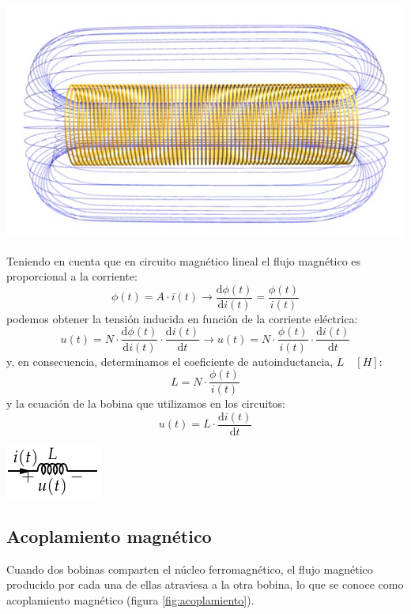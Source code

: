 \begin{center}
\includegraphics[height=0.2\textheight]{../figs/Solenoide.jpg}
\end{center}

Teniendo en cuenta que en circuito magnético lineal el flujo magnético es proporcional a la corriente:
\[
  \phi(t) = A \cdot i(t) \rightarrow   \frac{\mathrm{d}\phi(t)}{\mathrm{d} i(t)} = \frac{\phi(t)}{i(t)}
\]
podemos obtener la tensión inducida en función de la corriente eléctrica:
\[
u(t) = N \cdot \frac{\mathrm{d}\phi(t)}{\mathrm{d} i(t)} \cdot  \frac{\mathrm{d}i(t)}{\mathrm{d} t} \rightarrow u(t) = N \cdot \frac{\phi(t)}{i(t)} \cdot \frac{\mathrm{d}i(t)}{\mathrm{d} t}
\]
y, en consecuencia, determinamos el coeficiente de autoinductancia, $L \quad [H]$:
\[
  \boxed{L = N \cdot \frac{\phi(t)}{i(t)}}
\]
y la ecuación de la bobina que utilizamos en los circuitos:
\begin{equation}
  \label{eq:bobina-VI}
  \boxed{u(t) = L \cdot \frac{\mathrm{d}i(t)}{\mathrm{d} t}}
\end{equation}

\begin{center}
\includegraphics[height=0.1\textheight]{../figs/Bobina.pdf}
\end{center}

\subsection{Acoplamiento magnético}
\label{sec:acoplamiento}

Cuando dos bobinas comparten el núcleo ferromagnético, el flujo magnético producido por cada una de ellas atraviesa a la otra bobina, lo que se conoce como acoplamiento magnético (figura \ref{fig:acoplamiento}).

